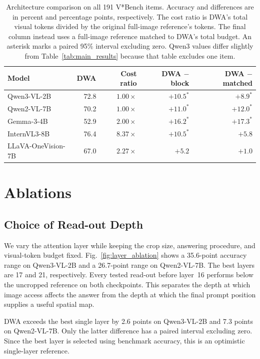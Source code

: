 \documentclass{article} %
\begin{document}
\begin{table}[tb]
\centering\small
\caption{Architecture comparison on all 191 V*Bench items. Accuracy
and differences are in percent and percentage points, respectively.
The cost ratio is DWA's total visual tokens divided by the original
full-image reference's tokens. The final column instead uses a
full-image reference matched to DWA's total budget. An asterisk marks
a paired 95\% interval excluding zero. Qwen3 values differ slightly
from Table~\ref{tab:main_results} because that table excludes one item.}
\label{tab:architecture_results}
\setlength{\tabcolsep}{4pt}
\begin{tabular}{lrrrr}
\toprule
Model & DWA & Cost ratio & DWA $-$ block & DWA $-$ matched \\
\midrule
Qwen3-VL-2B & 72.8 & $1.00\times$ & $+10.5^*$ & $+8.9^*$ \\
Qwen2-VL-7B & 70.2 & $1.00\times$ & $+11.0^*$ & $+12.0^*$ \\
Gemma-3-4B & 52.9 & $2.00\times$ & $+16.2^*$ & $+17.3^*$ \\
InternVL3-8B & 76.4 & $8.37\times$ & $+10.5^*$ & $+5.8$ \\
LLaVA-OneVision-7B & 67.0 & $2.27\times$ & $+5.2$ & $+1.0$ \\
\bottomrule
\end{tabular}
\end{table}



\section{Ablations}
\label{sec:ablations}

\subsection{Choice of Read-out Depth}
\label{sec:depth_ablation}

We vary the attention layer while keeping the crop size, answering
procedure, and visual-token budget fixed.
Fig.~\ref{fig:layer_ablation} shows a 35.6-point accuracy range on
Qwen3-VL-2B and a 26.7-point range on Qwen2-VL-7B. The best layers
are 17 and 21, respectively. Every tested read-out before layer~16
performs below the uncropped reference on both checkpoints. This
separates the depth at which image access affects the answer from the
depth at which the final prompt position supplies a useful spatial map.

DWA exceeds the best single layer by 2.6 points on Qwen3-VL-2B and
7.3 points on Qwen2-VL-7B. Only the latter difference has a paired
interval excluding zero. Since the best layer is selected using
benchmark accuracy, this is an optimistic single-layer reference.
\end{document}
